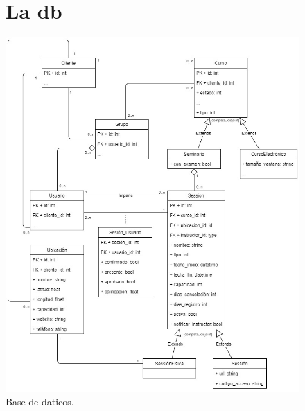\begin{figure}[h]
\section{La db}
\begin{center}
	\includegraphics[width=\textwidth]{figuras/database.jpg}
	\caption{Base de daticos.\label{fig:baseDeDatos}}
\end{center}
\end{figure}
